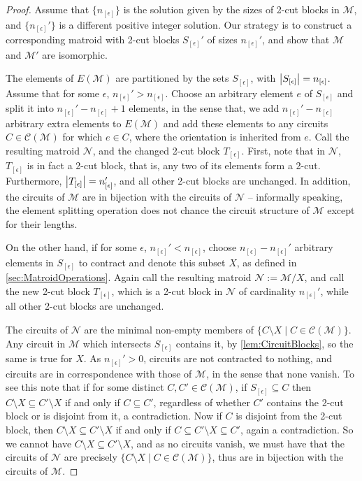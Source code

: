 \documentclass[12pt]{report}
\theoremstyle{definition}
\DeclarePairedDelimiter\abs{\lvert}{\rvert}
\def\calC{\mathcal C}
\def\calM{\mathcal M}
\def\calN{\mathcal N}
\theoremstyle{upright}
\begin{document}
\begin{proof}

    Assume that $\{n_{[\epsilon]}\}$ is the solution given by the sizes of 2-cut blocks in $\calM$, and $\{n_{[\epsilon]}'\}$ is a different positive integer solution.
    Our strategy is to construct a corresponding matroid with 2-cut blocks $S_{[\epsilon]}'$ of sizes $n_{[\epsilon]}'$, and show that $\calM$ and $\calM'$ are isomorphic.

    The elements of $E(\calM)$ are partitioned by the sets $S_{[\epsilon]}$, with $\abs*{S_{[\epsilon]}}=n_{[\epsilon]}$.
    Assume that for some $\epsilon$, $n_{[\epsilon]}'>n_{[\epsilon]}$.
    Choose an arbitrary element $e$ of $S_{[\epsilon]}$ and split it into $n_{[\epsilon]}'-n_{[\epsilon]}+1$ elements, in the sense that, we add $n_{[\epsilon]}'-n_{[\epsilon]}$ arbitrary extra elements to $E(\calM)$ and add these elements to any circuits $C\in\calC(\calM)$ for which $e\in C$, where the orientation is inherited from $e$.
    Call the resulting matroid $\calN$, and the changed 2-cut block $T_{[\epsilon]}$.
    First, note that in $\calN$, $T_{[\epsilon]}$ is in fact a 2-cut block, that is, any two of its elements form a 2-cut.
    Furthermore, $\abs*{T_{[\epsilon]}}=n_{[\epsilon]}'$, and all other 2-cut blocks are unchanged.
    In addition, the circuits of $\calM$ are in bijection with the circuits of $\calN$ -- informally speaking, the element splitting operation does not chance the circuit structure of $\calM$ except for their lengths.

    On the other hand, if for some $\epsilon$, $n_{[\epsilon]}'<n_{[\epsilon]}$, choose $n_{[\epsilon]}-n_{[\epsilon]}'$ arbitrary elements in $S_{[\epsilon]}$ to contract and denote this subset $X$, as defined in \cref{sec:MatroidOperations}.
    Again call the resulting matroid $\calN:=\calM/X$, and call the new 2-cut block $T_{[\epsilon]}$, which is a 2-cut block in $\calN$ of cardinality $n_{[\epsilon]}'$, while all other 2-cut blocks are unchanged.

    The circuits of $\calN$ are the minimal non-empty members of $\{C\setminus X\;|\;C\in\calC(\calM)\}$.
    Any circuit in $\calM$ which intersects $S_{[\epsilon]}$ contains it, by \cref{lem:CircuitBlocks}, so the same is true for $X$.
    As $n_{[\epsilon]}'>0$, circuits are not contracted to nothing, and circuits are in correspondence with those of $\calM$, in the sense that none vanish.
    To see this note that if for some distinct $C, C'\in\calC(\calM)$, if $S_{[\epsilon]}\subseteq C$ then $C\setminus X\subseteq C'\setminus X$ if and only if $C\subseteq C'$, regardless of whether $C'$ contains the 2-cut block or is disjoint from it, a contradiction.
    Now if $C$ is disjoint from the 2-cut block, then $C\setminus X\subseteq C'\setminus X$ if and only if $C\subseteq C'\setminus X\subseteq C'$, again a contradiction.
    So we cannot have $C\setminus X\subseteq C'\setminus X$, and as no circuits vanish, we must have that the circuits of $\calN$ are precisely $\{C\setminus X\;|\;C\in\calC(\calM)\}$, thus are in bijection with the circuits of $\calM$.


\end{proof}
\end{document}
